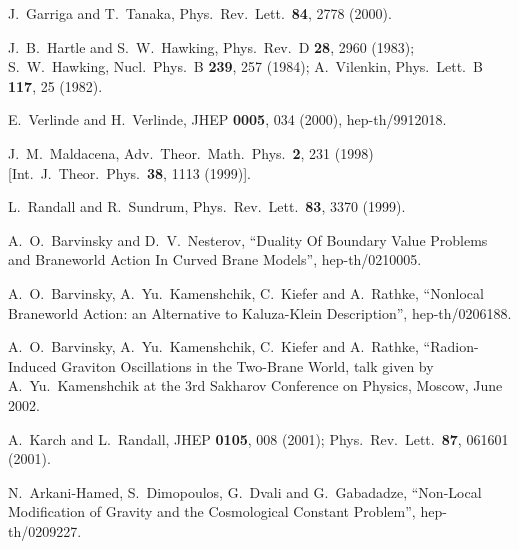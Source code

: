 \documentclass[a4paper,12pt]{article}
\begin{document}
\begin{thebibliography}{9}
 J.~Garriga and T.~Tanaka,
Phys.\ Rev.\ Lett.\  {\bf 84}, 2778 (2000).

 J.~B.~Hartle and S.~W.~Hawking,
Phys.\ Rev.\ D {\bf 28}, 2960 (1983);
S.~W.~Hawking,
Nucl.\ Phys.\ B {\bf 239}, 257 (1984);
A.~Vilenkin,
Phys.\ Lett.\ B {\bf 117}, 25 (1982).

 E.~Verlinde and H.~Verlinde,
JHEP {\bf 0005}, 034 (2000), hep-th/9912018.

J.~M.~Maldacena,
Adv.\ Theor.\ Math.\ Phys.\  {\bf 2}, 231 (1998)
[Int.\ J.\ Theor.\ Phys.\  {\bf 38}, 1113 (1999)].

 L.~Randall and R.~Sundrum,
Phys.\ Rev.\ Lett.\  {\bf 83}, 3370 (1999).

 A.~O.~Barvinsky and D.~V.~Nesterov,
``Duality Of Boundary Value Problems and Braneworld Action In
Curved Brane Models'', hep-th/0210005.

 A.~O.~Barvinsky, A.~Yu.~Kamenshchik, C.~Kiefer
and A.~Rathke, ``Nonlocal Braneworld Action: an Alternative
to Kaluza-Klein Description'', hep-th/0206188.

 A.~O.~Barvinsky, A.~Yu.~Kamenshchik, C.~Kiefer
and A.~Rathke, ``Radion-Induced Graviton Oscillations in the
Two-Brane World, talk given by A.~Yu.~Kamenshchik at the 3rd
Sakharov Conference on Physics, Moscow, June 2002.

 A.~Karch and L.~Randall, JHEP {\bf 0105},
008 (2001); Phys.\ Rev.\ Lett.\ {\bf 87}, 061601 (2001).

 N.~Arkani-Hamed, S.~Dimopoulos, G.~Dvali and
G.~Gabadadze, ``Non-Local Modification of Gravity and the
Cosmological Constant Problem'', hep-th/0209227.

\end{thebibliography}
\end{document}
